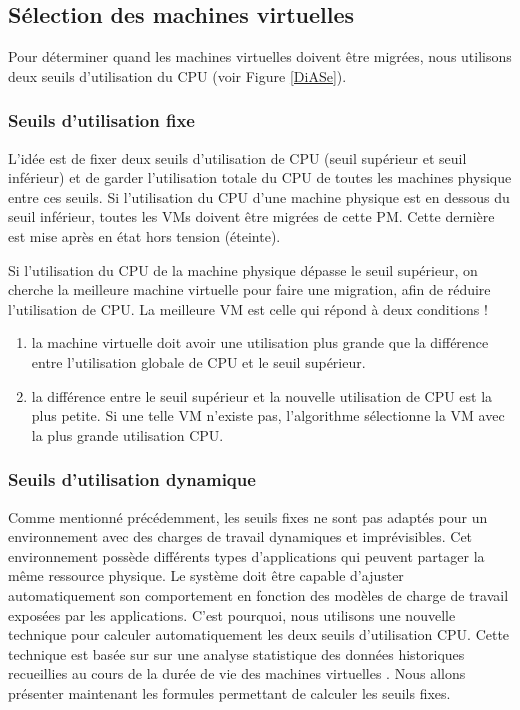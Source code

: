 \subsection{Sélection des machines virtuelles}
\begin{onehalfspace}
Pour déterminer quand les machines virtuelles doivent être migrées, nous utilisons deux seuils d'utilisation du CPU (voir Figure \ref{DiASe}).
\subsubsection{Seuils d'utilisation fixe}
L’idée est de fixer deux seuils d’utilisation de CPU (seuil supérieur et seuil inférieur) et de garder l’utilisation totale du CPU de toutes les machines physique entre ces seuils. Si l’utilisation du CPU d’une machine physique est en dessous du seuil inférieur, toutes les VMs doivent être migrées de cette PM. Cette dernière est mise après en état hors tension (éteinte).

Si l’utilisation du CPU de la machine physique dépasse le seuil supérieur, on cherche la meilleure machine virtuelle pour faire une migration, afin de réduire l’utilisation de CPU. La meilleure VM est celle qui répond à deux conditions !
\begin{enumerate} [label=\Roman*)]
\item la machine virtuelle doit avoir une utilisation plus grande que la différence entre l’utilisation globale de CPU et le seuil supérieur.
\item la différence entre le seuil supérieur et la nouvelle utilisation de CPU est la plus petite. Si une telle VM n’existe pas, l’algorithme sélectionne la VM avec la plus grande utilisation CPU.
\end{enumerate}


\subsubsection{Seuils d'utilisation dynamique}
Comme mentionné précédemment, les seuils fixes ne sont pas adaptés pour un environnement avec des charges de travail dynamiques et imprévisibles. Cet environnement possède différents types d'applications qui peuvent partager la même ressource physique. Le système doit être capable d'ajuster automatiquement son comportement en fonction des modèles de charge de travail exposées par les applications. C'est pourquoi, nous utilisons une nouvelle technique pour calculer automatiquement les deux seuils d'utilisation CPU. Cette technique est basée sur sur une analyse statistique des données historiques recueillies au cours de la durée de vie des machines virtuelles \cite{ref44}. Nous allons présenter maintenant les formules permettant de calculer les seuils fixes.


\end{onehalfspace}

